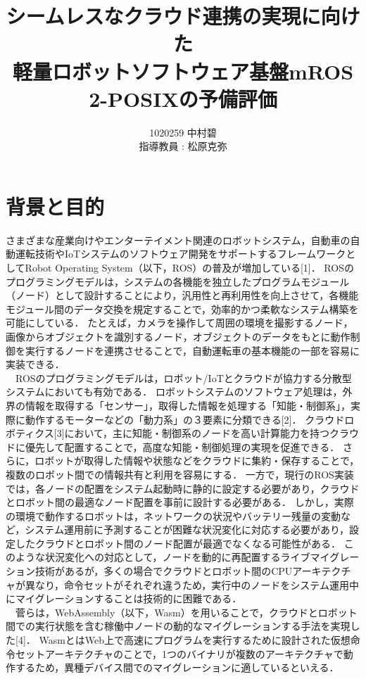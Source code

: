 \documentclass[11pt]{ujarticle}
\author{%
1020259 中村碧\\指導教員 : 松原克弥
}
\title{シームレスなクラウド連携の実現に向けた\\軽量ロボットソフトウェア基盤mROS 2-POSIXの予備評価}
\begin{document}
\maketitle

\section{背景と目的}
\label{sec:introduction}
さまざまな産業向けやエンターテイメント関連のロボットシステム，自動車の自動運転技術やIoTシステムのソフトウェア開発をサポートするフレームワークとしてRobot Operating System（以下，ROS）の普及が増加している[1]．
ROSのプログラミングモデルは，システムの各機能を独立したプログラムモジュール（ノード）として設計することにより，汎用性と再利用性を向上させて，各機能モジュール間のデータ交換を規定することで，効率的かつ柔軟なシステム構築を可能にしている．
たとえば，カメラを操作して周囲の環境を撮影するノード，画像からオブジェクトを識別するノード，オブジェクトのデータをもとに動作制御を実行するノードを連携させることで，自動運転車の基本機能の一部を容易に実装できる．
\\　ROSのプログラミングモデルは，ロボット/IoTとクラウドが協力する分散型システムにおいても有効である．
ロボットシステムのソフトウェア処理は，外界の情報を取得する「センサー」，取得した情報を処理する「知能・制御系」，実際に動作するモーターなどの「動力系」の３要素に分類できる[2]．
クラウドロボティクス[3]において，主に知能・制御系のノードを高い計算能力を持つクラウドに優先して配置することで，高度な知能・制御処理の実現を促進できる．
さらに，ロボットが取得した情報や状態などをクラウドに集約・保存することで，複数のロボット間での情報共有と利用を容易にする．
一方で，現行のROS実装では，各ノードの配置をシステム起動時に静的に設定する必要があり，クラウドとロボット間の最適なノード配置を事前に設計する必要がある．
しかし，実際の環境で動作するロボットは，ネットワークの状況やバッテリー残量の変動など，システム運用前に予測することが困難な状況変化に対応する必要があり，設定したクラウドとロボット間のノード配置が最適でなくなる可能性がある．
このような状況変化への対応として，ノードを動的に再配置するライブマイグレーション技術があるが，多くの場合でクラウドとロボット間のCPUアーキテクチャが異なり，命令セットがそれぞれ違うため，実行中のノードをシステム運用中にマイグレーションすることは技術的に困難である．
\\　菅らは，WebAssembly（以下，Wasm）を用いることで，クラウドとロボット間での実行状態を含む稼働中ノードの動的なマイグレーションする手法を実現した[4]．
WasmとはWeb上で高速にプログラムを実行するために設計された仮想命令セットアーキテクチャのことで，1つのバイナリが複数のアーキテクチャで動作するため，異種デバイス間でのマイグレーションに適しているといえる．
\end{document}

